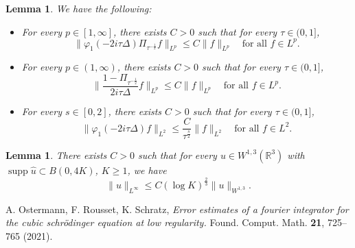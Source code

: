\documentclass[10pt,a4paper]{article}
\newtheorem{lemma}[theorem]{Lemma}
\DeclareMathOperator{\supp}{supp}
\begin{document}
  \begin{lemma}\label{lemfilter1}
    We have the following:
    \begin{itemize}
      \item For every \(p \in [1,\infty]\), there exists \(C>0\) such that for every
        \(\tau \in (0,1]\),
        \begin{equation}\label{101}
          \|\varphi_1(-2i\tau\Delta)\Pi_{\tau^{-\frac12}} f\|_{L^p} \leq
          C\|f\|_{L^p} \quad\text{for all } f \in L^p.
        \end{equation}
      \item For every \(p \in (1,\infty)\), there exists \(C>0\) such that for every
        \(\tau \in (0,1]\),
        \begin{equation}\label{102}
          \|\frac{1-\Pi_{\tau^{-\frac12}}}{2i\tau\Delta} f\|_{L^p} \leq
          C\|f\|_{L^p} \quad\text{for all } f \in L^p.
        \end{equation}
      \item For every \(s \in [0,2]\), there exists \(C>0\) such that for every
        \(\tau \in (0,1]\),
        \begin{equation}\label{103}
          \|\varphi_1(-2i\tau\Delta) f\|_{L^2} \leq
          \frac C{\tau^\frac s2}\|f\|_{L^2} \quad\text{for all } f \in L^2.
        \end{equation}
    \end{itemize}
  \end{lemma}

  \begin{lemma}\label{sobbord}
    There exists \(C>0\) such that for every \(u\in W^{1,3}(\mathbb R^3)\) with
    \(\supp \hat{u} \subset B(0,4K)\), \(K \geq 1\), we have
    \[ \|u\|_{L^\infty} \leq C (\log K)^\frac23 \|u\|_{W^{1,3}}. \]
  \end{lemma}

  \begin{thebibliography}{99}
      {\rm A. Ostermann, F. Rousset, K. Schratz,}
      {\em Error estimates of a fourier integrator for the cubic schr\"odinger equation at low regularity.}
      Found. Comput. Math. \textbf{21}, 725--765 (2021).

  \end{thebibliography}
\end{document}
